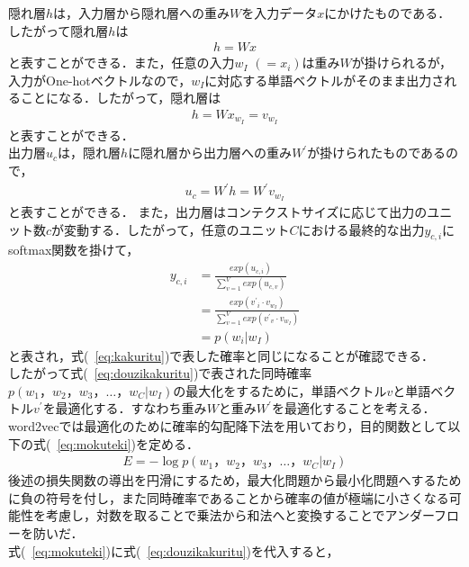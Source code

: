 隠れ層$ h $は，入力層から隠れ層への重み$ W $を入力データ$ x $にかけたものである．したがって隠れ層$ h $は
\begin{align}
h = Wx \nonumber
\end{align}
と表すことができる．また，任意の入力$ w_{I} $ $ (= x_{i}) $は重み$ W $が掛けられるが，入力がOne-hotベクトルなので，$ w_{I} $に対応する単語ベクトルがそのまま出力されることになる．したがって，隠れ層は
\begin{align}
h = Wx_{w_{I}} = v_{w_{I}} \nonumber
\end{align}
と表すことができる．\\
出力層$ u_{c} $は，隠れ層$ h $に隠れ層から出力層への重み$ W^{\prime} $が掛けられたものであるので，
\begin{align}
u_{c} = W^{\prime}h = W^{\prime}v_{w_{I}} \nonumber
\end{align}
と表すことができる．
また，出力層はコンテクストサイズに応じて出力のユニット数$ c $が変動する．したがって，任意のユニット$ C $における最終的な出力$ y_{c,i} $にsoftmax関数を掛けて，
\begin{align}
y_{c,i} &= \frac{exp(u_{c,i})}{\sum_{v=1}^{V} exp(u_{c,v})} \nonumber \\
        &= \frac{exp({v^{\prime}}_{i} \cdot v_{w_{I}})}{\sum_{v=1}^{V}exp({v^{\prime}}_{v} \cdot v_{w_{I}})} \nonumber \\
        &= p(w_{i}|w_{I}) \nonumber
\end{align}
と表され，式(~\ref{eq:kakuritu})で表した確率と同じになることが確認できる．\\
したがって式(~\ref{eq:douzikakuritu})で表された同時確率$ p(w_{1}，w_{2}，w_{3}， \ldots ，w_{C}|w_{I}) $の最大化をするために，単語ベクトル$ v $と単語ベクトル$ v^{\prime} $を最適化する．すなわち重み$ W $と重み$ W^{\prime} $を最適化することを考える．word2vecでは最適化のために確率的勾配降下法を用いており，目的関数として以下の式(~\ref{eq:mokuteki})を定める．
\begin{align}
E = - \log p(w_{1}，w_{2}，w_{3}， \ldots ，w_{C}|w_{I}) \label{eq:mokuteki}
\end{align}
後述の損失関数の導出を円滑にするため，最大化問題から最小化問題へするために負の符号を付し，また同時確率であることから確率の値が極端に小さくなる可能性を考慮し，対数を取ることで乗法から和法へと変換することでアンダーフローを防いだ．\\
式(~\ref{eq:mokuteki})に式(~\ref{eq:douzikakuritu})を代入すると，
